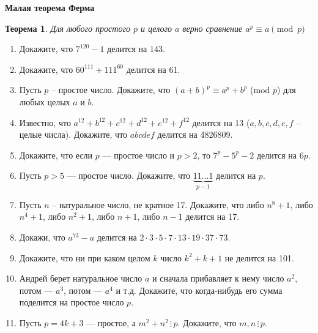 \documentclass{article}
\newtheorem{theorem}{Теорема}
\begin{document}
\large
	
\begin{center}
	\textbf{Малая теорема Ферма}
\end{center}

\begin{theorem}
	Для любого простого $p$ и целого $a$ верно сравнение $a^p \equiv a \pmod p$
\end{theorem}

\begin{enumerate}[label*=\protect\fbox{\arabic{enumi}}]
	
\item Докажите, что $7^{120} - 1$  делится на $143$.
	
\item Докажите, что $60^{111}+111^{60}$ делится на 61.

\item Пусть $p$ – простое число. Докажите, что  $(a + b)^p \equiv a^p + b^p$ (mod $p$) для любых целых $a$ и $b$.

\item Известно, что  $a^{12} + b^{12} + c^{12} + d^{12} + e^{12} + f^{12}$  делится на 13 ($a, b, c, d, e, f$ – целые числа). Докажите, что $abcdef$ делится на 4826809.

\item Докажите, что если $p$ --- простое число и $p > 2$, то $7^p - 5^p - 2$ делится на $6p$.

\item Пусть $p>5$ --- простое число. Докажите, что $\underbrace{11\dots 1}_{p-1}$ делится на $p$.

\item Пусть $n$ – натуральное число, не кратное 17. Докажите, что либо $n^8 + 1$,  либо $n^4 + 1$,  либо $n^2 + 1$,  либо $n + 1$, либо $n - 1$  делится на 17.

\item Докажи, что $a^{73} - a$  делится на $2\cdot3\cdot5\cdot7\cdot13\cdot19\cdot37\cdot73$.

\item Докажите, что ни при каком целом $k$ число $k^2 + k + 1$  не делится на 101.

\item Андрей берет натуральное число $a$ и сначала прибавляет к нему число $a^2$, потом --- $a^3$, потом --- $a^4$ и т.д. Докажите, что когда-нибудь его сумма поделится на простое число $p$.

\item Пусть $p = 4k+3$ --- простое, а $m^2 + n^2 \, \vdots \, p$. Докажите, что $m,n \, \vdots \, p$.


\end{enumerate}
\end{document}
